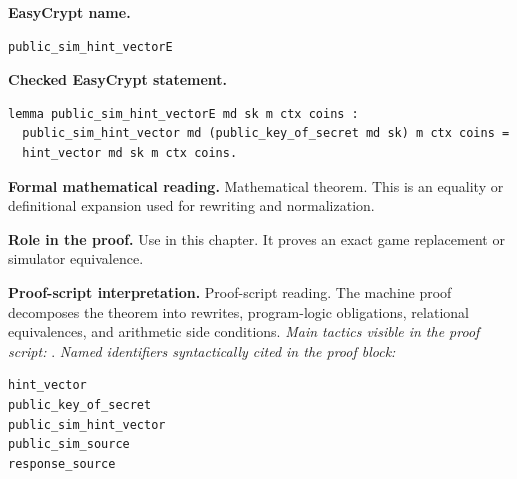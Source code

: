 \begin{formaltheorem}
\noindent\textbf{EasyCrypt name.}
\begin{lstlisting}[language=EasyCrypt,basicstyle=\ttfamily\scriptsize]
public_sim_hint_vectorE
\end{lstlisting}
\noindent\textbf{Checked EasyCrypt statement.}
\begin{lstlisting}[language=EasyCrypt,basicstyle=\ttfamily\scriptsize]
lemma public_sim_hint_vectorE md sk m ctx coins :
  public_sim_hint_vector md (public_key_of_secret md sk) m ctx coins =
  hint_vector md sk m ctx coins.
\end{lstlisting}
\noindent\textbf{Formal mathematical reading.}
Mathematical theorem. This is an equality or definitional expansion used for rewriting and normalization.

\noindent\textbf{Role in the proof.}
Use in this chapter. It proves an exact game replacement or simulator equivalence.

\noindent\textbf{Proof-script interpretation.}
Proof-script reading. The machine proof decomposes the theorem into rewrites, program-logic obligations, relational equivalences, and arithmetic side conditions.
\emph{Main tactics visible in the proof script:} .
\emph{Named identifiers syntactically cited in the proof block:}
\begin{lstlisting}[language=EasyCrypt,basicstyle=\ttfamily\scriptsize]
hint_vector
public_key_of_secret
public_sim_hint_vector
public_sim_source
response_source
\end{lstlisting}

\end{formaltheorem}

